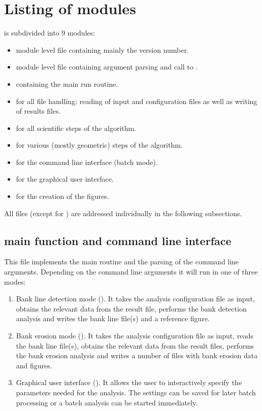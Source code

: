 \section{Listing of modules}

\dfastbe is subdivided into 9 modules:

\begin{itemize}
\item {} module level file containing mainly the version number.
\item {} module level file containing argument parsing and call to .
\item {} containing the main run routine.
\item {} for all file handling: reading of input and configuration files as well as writing of results files.
\item {} for all scientific steps of the algorithm.
\item {} for various (mostly geometric) steps of the algorithm.
\item {} for the command line interface (batch mode).
\item {} for the graphical user interface.
\item {} for the creation of the figures.
\end{itemize}

All files (except for ) are addressed individually in the following subsections.

\subsection{main function  and command line interface }

This file implements the main routine and the parsing of the command line arguments.
Depending on the command line arguments it will run in one of three modes:

\begin{enumerate}
\item Bank line detection mode ().
It takes the analysis configuration file as input, obtains the relevant data from the \dflowfm result file, performs the bank detection analysis and writes the bank line file(s) and a reference figure.
\item Bank erosion mode ().
It takes the analysis configuration file as input, reads the bank line file(s), obtains the relevant data from the \dflowfm result files, performs the bank erosion analysis and writes a number of files with bank erosion data and figures.
\item Graphical user interface ().
It allows the user to interactively specify the parameters needed for the analysis.
The settings can be saved for later batch processing or a batch analysis can be started immediately.
\end{enumerate}

